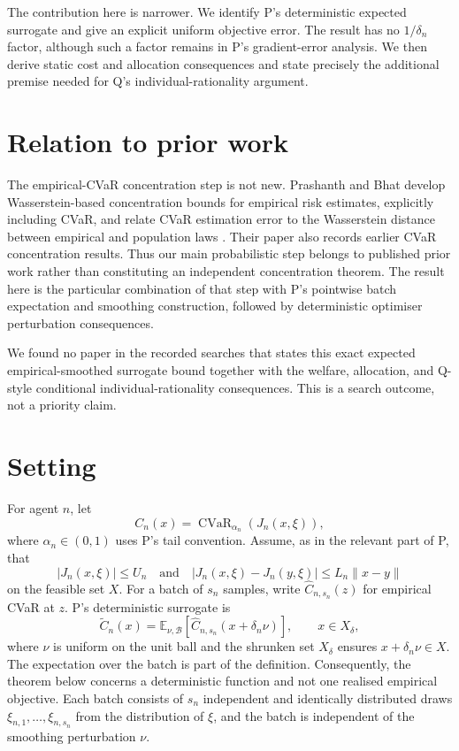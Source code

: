 \documentclass{article}
\DeclareMathOperator{\CVaR}{CVaR}
\begin{document}
The contribution here is narrower.  We identify P's deterministic expected surrogate and give an explicit uniform objective error.  %
The result has no $1/\delta_n$ factor, although such a factor remains in P's gradient-error analysis.  %
We then derive static cost and allocation consequences and state precisely the additional premise needed for Q's individual-rationality argument.  %

\section{Relation to prior work}

The empirical-CVaR concentration step is not new.  Prashanth and Bhat develop Wasserstein-based concentration bounds for empirical risk estimates, explicitly including CVaR, and relate CVaR estimation error to the Wasserstein distance between empirical and population laws \cite{prashanth2019}.  Their paper also records earlier CVaR concentration results.  Thus our main probabilistic step belongs to published prior work rather than constituting an independent concentration theorem.  The result here is the particular combination of that step with P's pointwise batch expectation and smoothing construction, followed by deterministic optimiser perturbation consequences.  %

We found no paper in the recorded searches that states this exact expected empirical-smoothed surrogate bound together with the welfare, allocation, and Q-style conditional individual-rationality consequences.  This is a search outcome, not a priority claim.

\section{Setting}

For agent $n$, let
\[
 C_n(x)=\CVaR_{\alpha_n}(J_n(x,\xi)),
\]
where $\alpha_n\in(0,1)$ uses P's tail convention.  Assume, as in the relevant part of P, that
\[
 |J_n(x,\xi)|\leq U_n
 \quad\text{and}\quad
 |J_n(x,\xi)-J_n(y,\xi)|\leq L_n\|x-y\|
\]
on the feasible set $X$.  %
For a batch of $s_n$ samples, write $\widehat C_{n,s_n}(z)$ for empirical CVaR at $z$.  P's deterministic surrogate is
\[
 \widetilde C_n(x)=
 \mathbb E_{\nu,\mathcal B}\!\left[
   \widehat C_{n,s_n}(x+\delta_n\nu)
 \right],
 \qquad x\in X_\delta,
\]
where $\nu$ is uniform on the unit ball and the shrunken set $X_\delta$ ensures $x+\delta_n\nu\in X$.  %
The expectation over the batch is part of the definition.  Consequently, the theorem below concerns a deterministic function and not one realised empirical objective.  %
Each batch consists of $s_n$ independent and identically distributed draws
$\xi_{n,1},\ldots,\xi_{n,s_n}$ from the distribution of $\xi$, and the batch
is independent of the smoothing perturbation $\nu$.  %
\end{document}
